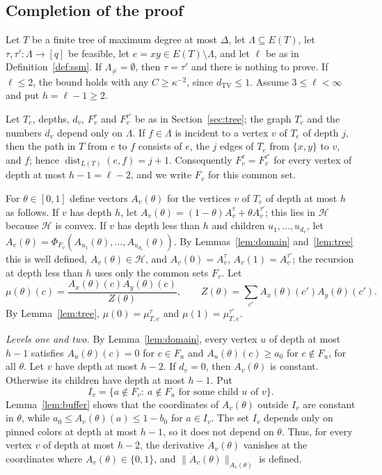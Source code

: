 \documentclass{amsart}
\numberwithin{equation}{section}
\theoremstyle{plain}
\theoremstyle{definition}
\theoremstyle{remark}
\newcommand{\dTV}{d_{\mathrm{TV}}}
\newcommand{\dist}{\operatorname{dist}}
\newcommand{\cH}{\mathcal{H}}
\begin{document}
\subsection{Completion of the proof}
Let $T$ be a finite tree of maximum degree at most $\Delta$, let $\Lambda\subseteq E(T)$, let $\tau,\tau'\colon\Lambda\to[q]$ be feasible, let $e=xy\in E(T)\setminus\Lambda$, and let $\ell$ be as in Definition~\ref{def:ssm}. If $\Lambda_{\ne}=\emptyset$, then $\tau=\tau'$ and there is nothing to prove. If $\ell\le2$, the bound holds with any $C\ge\kappa^{-2}$, since $\dTV\le1$. Assume $3\le\ell<\infty$ and put $h=\ell-1\ge2$.

Let $T_e$, depths, $d_v$, $F_v^\tau$ and $F_v^{\tau'}$ be as in Section~\ref{sec:tree}; the graph $T_e$ and the numbers $d_v$ depend only on $\Lambda$. If $f\in\Lambda$ is incident to a vertex $v$ of $T_e$ of depth $j$, then the path in $T$ from $e$ to $f$ consists of $e$, the $j$ edges of $T_e$ from $\{x,y\}$ to $v$, and $f$; hence $\dist_{L(T)}(e,f)=j+1$. Consequently $F_v^\tau=F_v^{\tau'}$ for every vertex of depth at most $h-1=\ell-2$, and we write $F_v$ for this common set.

For $\theta\in[0,1]$ define vectors $A_v(\theta)$ for the vertices $v$ of $T_e$ of depth at most $h$ as follows. If $v$ has depth $h$, let $A_v(\theta)=(1-\theta)A_v^\tau+\theta A_v^{\tau'}$; this lies in $\cH$ because $\cH$ is convex. If $v$ has depth less than $h$ and children $u_1,\dots,u_{d_v}$, let $A_v(\theta)=\Phi_{F_v}(A_{u_1}(\theta),\dots,A_{u_{d_v}}(\theta))$. By Lemmas~\ref{lem:domain} and~\ref{lem:tree} this is well defined, $A_v(\theta)\in\cH$, and $A_v(0)=A_v^\tau$, $A_v(1)=A_v^{\tau'}$; the recursion at depth less than $h$ uses only the common sets $F_v$. Let
\[
\mu(\theta)(c)=\frac{A_x(\theta)(c)A_y(\theta)(c)}{Z(\theta)},\qquad Z(\theta)=\sum_{c'}A_x(\theta)(c')A_y(\theta)(c').
\]
By Lemma~\ref{lem:tree}, $\mu(0)=\mu_{T,e}^\tau$ and $\mu(1)=\mu_{T,e}^{\tau'}$.

\emph{Levels one and two.} By Lemma~\ref{lem:domain}, every vertex $u$ of depth at most $h-1$ satisfies $A_u(\theta)(c)=0$ for $c\in F_u$ and $A_u(\theta)(c)\ge a_0$ for $c\notin F_u$, for all $\theta$. Let $v$ have depth at most $h-2$. If $d_v=0$, then $A_v(\theta)$ is constant. Otherwise its children have depth at most $h-1$. Put
\[
I_v=\{a\notin F_v:\ a\notin F_u\text{ for some child }u\text{ of }v\}.
\]
Lemma~\ref{lem:buffer} shows that the coordinates of $A_v(\theta)$ outside $I_v$ are constant in $\theta$, while $a_0\le A_v(\theta)(a)\le1-b_0$ for $a\in I_v$. The set $I_v$ depends only on pinned colors at depth at most $h-1$, so it does not depend on $\theta$. Thus, for every vertex $v$ of depth at most $h-2$, the derivative $\dot A_v(\theta)$ vanishes at the coordinates where $A_v(\theta)\in\{0,1\}$, and $\|\dot A_v(\theta)\|_{A_v(\theta)}$ is defined.
\end{document}
